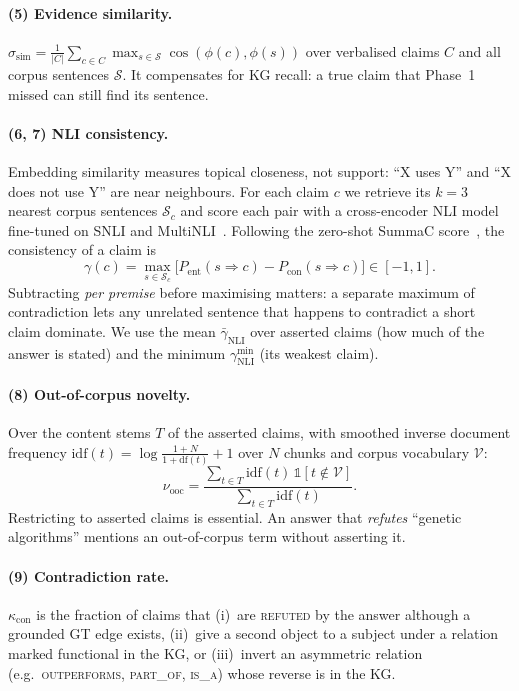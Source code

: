 \documentclass[10pt,twocolumn]{article}
\theoremstyle{remark}
\begin{document}
\paragraph{(5) Evidence similarity.}
$\sigma_{\mathrm{sim}}=\frac{1}{|C|}\sum_{c\in C}\max_{s\in\mathcal S}\cos(\phi(c),\phi(s))$ over verbalised claims $C$
and all corpus sentences $\mathcal S$. It compensates for KG recall: a true claim that Phase~1 missed can still find
its sentence.

\paragraph{(6, 7) NLI consistency.}
Embedding similarity measures topical closeness, not support: ``X uses Y'' and ``X does not use Y'' are near
neighbours. For each claim $c$ we retrieve its $k=3$ nearest corpus sentences $\mathcal S_c$ and score each pair with a
cross-encoder NLI model~\cite{he2023debertav3} fine-tuned on SNLI and MultiNLI~\cite{bowman2015snli,williams2018mnli}.
Following the zero-shot SummaC score~\cite{laban2022summac}, the consistency of a claim is
\begin{equation}
\gamma(c)=\max_{s\in\mathcal S_c}\big[P_{\mathrm{ent}}(s\Rightarrow c)-P_{\mathrm{con}}(s\Rightarrow c)\big]\in[-1,1].
\end{equation}
Subtracting \emph{per premise} before maximising matters: a separate maximum of contradiction lets any unrelated
sentence that happens to contradict a short claim dominate. We use the mean $\bar\gamma_{\mathrm{NLI}}$ over asserted
claims (how much of the answer is stated) and the minimum $\gamma^{\min}_{\mathrm{NLI}}$ (its weakest claim).

\paragraph{(8) Out-of-corpus novelty.}
Over the content stems $T$ of the asserted claims, with smoothed inverse document frequency
$\mathrm{idf}(t)=\log\frac{1+N}{1+\mathrm{df}(t)}+1$ over $N$ chunks and corpus vocabulary $\mathcal V$:
\begin{equation}
\nu_{\mathrm{ooc}}=\frac{\sum_{t\in T}\mathrm{idf}(t)\,\mathbb 1[t\notin\mathcal V]}{\sum_{t\in T}\mathrm{idf}(t)}.
\end{equation}
Restricting to asserted claims is essential. An answer that \emph{refutes} ``genetic algorithms'' mentions an
out-of-corpus term without asserting it.

\paragraph{(9) Contradiction rate.}
$\kappa_{\mathrm{con}}$ is the fraction of claims that (i)~are \textsc{refuted} by the answer although a grounded GT
edge exists, (ii)~give a second object to a subject under a relation marked functional in the KG, or (iii)~invert an
asymmetric relation (e.g.\ \textsc{outperforms}, \textsc{part\_of}, \textsc{is\_a}) whose reverse is in the KG.
\end{document}
